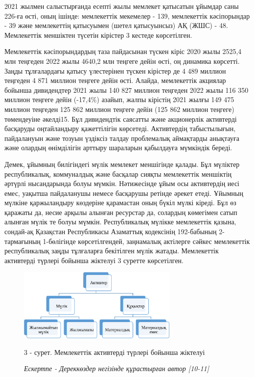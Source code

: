 \begin{multicols}{2}
2021 жылмен салыстырғанда есепті жылы мемлекет қатысатын ұйымдар саны
226-ға өсті, оның ішінде: мемлекеттік мекемелер - 139, мемлекеттік
кәсіпорындар - 39 және мемлекеттің қатысуымен (шетел қатысуынсыз) АҚ
(ЖШС) - 48. Мемлекеттік меншіктен түсетін кірістер 3 кестеде
көрсетілген.

Мемлекеттік кәсіпорындардың таза пайдасынан түскен кіріс 2020 жылы
2525,4 млн теңгеден 2022 жылы 4640,2 млн теңгеге дейін өсті, оң динамика
көрсетті. Заңды тұлғалардағы қатысу үлестерінен түскен кірістер де 4 489
миллион теңгеден 4 871 миллион теңгеге дейін өсті. Алайда, мемлекеттік
акциялар бойынша дивидендтер 2021 жылы 140 827 миллион теңгеден 2022
жылы 116 350 миллион теңгеге дейін (-17,4\%) азайып, жалпы кірістің 2021
жылғы 149 475 миллион теңгеден 125 862 миллион теңгеге дейін (125 862
миллион теңгеге) төмендеуіне әкелді15. Бұл дивидендтік саясатты және
акционерлік активтерді басқаруды оңтайландыру қажеттілігін көрсетеді.
Активтердің табыстылығын, пайдалануын және тозуын үздіксіз талдау
проблемалық аймақтарды анықтауға және олардың өнімділігін арттыру
шараларын қабылдауға мүмкіндік береді.

Демек, ұйымның билігіндегі мүлік мемлекет меншігінде қалады. Бұл
мүліктер республикалық, коммуналдық және басқалар сияқты мемлекеттік
меншіктің әртүрлі нысандарында болуы мүмкін. Нәтижесінде ұйым осы
активтердің иесі емес, уақытша пайдаланушы немесе басқарушы ретінде
әрекет етеді. Ұйымның мүлкіне қаржыландыру көздеріне қарамастан оның
бүкіл мүлкі кіреді. Бұл өз қаражаты да, несие арқылы алынған ресурстар
да, солардың көмегімен сатып алынған мүлік те болуы мүмкін.
Республикалық мүлікке мемлекеттік қазына, сондай-ақ Қазақстан
Республикасы Азаматтық кодексінің 192-бабының 2-тармағының 1-бөлігінде
көрсетілгендей, заңнамалық актілерге сәйкес мемлекеттік республикалық
заңды тұлғаларға бекітілген мүлік жатады. Мемлекеттік активтерді түрлері
бойынша жіктелуі 3 суретте көрсетілген.
\end{multicols}

\begin{figure}[H]
	\centering
	\includegraphics[width=0.7\textwidth]{media/ekon2/image11}
	\caption*{3 - сурет. Мемлекеттік активтерді түрлері бойынша жіктелуі}
	\caption*{\normalfont \emph{Ескертпе - Дереккөздер негізінде құрастырған автор {[}10-11{]}}}
\end{figure}


